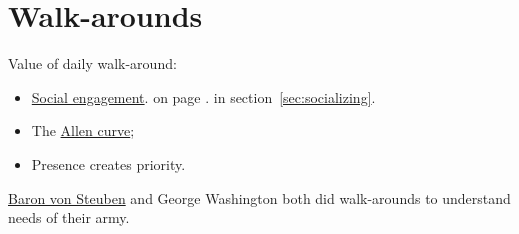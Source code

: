 \section{Walk-arounds\label{sec:walk-arounds}}

Value of daily walk-around: 
\begin{itemize}
    \item \hyperref[sec:socializing]{Social engagement}.
    \ifpageref
    on page \pageref{sec:socializing}.
    \fi
    \ifsectionref
    in section~\ref{sec:socializing}.
    \fi
    \item The \href{https://en.wikipedia.org/wiki/Allen_curve}{Allen curve}; 
    \item Presence creates priority.
\end{itemize}

\href{https://en.wikipedia.org/wiki/Friedrich_Wilhelm_von_Steuben}{Baron von Steuben} and George Washington both did walk-arounds to understand needs of their army. 
